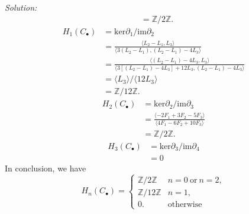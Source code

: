 \documentclass[a4paper, 11pt]{article}
\newenvironment{solution}
    {\textit{Solution:}}
    {}
\begin{document}
\begin{solution}
\begin{align*}
                   & = \mathbb{Z}/2 \mathbb{Z}.
\end{align*}
\begin{align*}
    H_1(C_\bullet) & = \text{ker}{\partial_1}/\text{im}\partial_2\\
                   & = \frac{\langle L_2-L_1,L_3\rangle}{\langle 3(L_2-L_1), (L_2-L_1)-4L_3\rangle}\\ 
                   & = \frac{\langle (L_2-L_1)-4L_3,L_3\rangle}{\langle 3[(L_2-L_1)-4L_3]+12L_3, (L_2-L_1)-4L_3\rangle}\\ 
                   & = \langle L_3\rangle/\langle 12L_3\rangle \\ 
                   & =\mathbb{Z}/ 12 \mathbb{Z}.
\end{align*}
\begin{align*}
    H_2(C_\bullet) & = \text{ker}{\partial_2}/\text{im}\partial_3\\
                   & = \frac{\langle -2F_1+3F_2-5F_3\rangle}{\langle 4F_1-6F_2+10F_3\rangle}\\ 
                   & =\mathbb{Z}/2 \mathbb{Z}.
\end{align*}
\begin{align*}
    H_3(C_\bullet) & = \text{ker}{\partial_3}/\text{im}\partial_4\\
                   & = 0
\end{align*}
In conclusion, we have 
$$H_n(C_\bullet)=\begin{cases}
    \mathbb{Z}/2 \mathbb{Z} & n=0\ \text{or} \ n=2,\\ 
    \mathbb{Z}/12 \mathbb{Z} & n=1,\\ 
    0. & \text{otherwise} 
\end{cases}$$

\end{solution}
\end{document}
